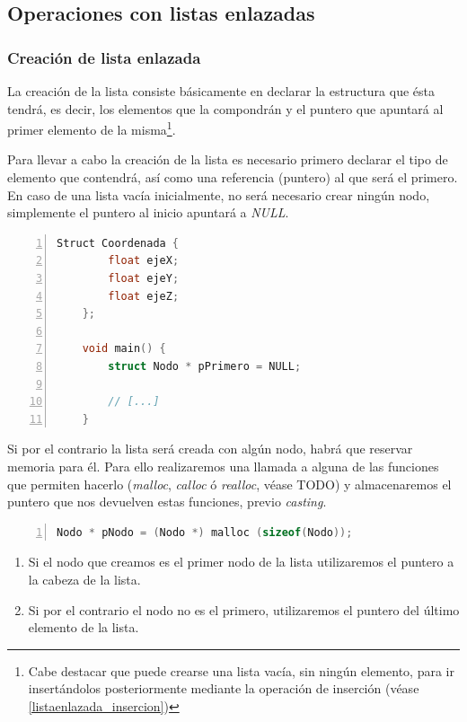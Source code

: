 \documentclass[a4paper, 11pt, titlepage]{article}
\begin{document}
    \subsection{Operaciones con listas enlazadas}

        \subsubsection{Creación de lista enlazada} 
        
            La creación de la lista consiste básicamente en declarar la estructura que ésta 
            tendrá, es decir, los elementos que la compondrán y el puntero que apuntará al 
            primer elemento de la misma\footnote{
                Cabe destacar que puede crearse una lista vacía, sin ningún elemento, para 
                ir insertándolos posteriormente mediante la operación de inserción (véase 
                \ref{listaenlazada_insercion})
            }.

            Para llevar a cabo la creación de la lista es necesario primero declarar el tipo 
            de elemento que contendrá, así como una referencia (puntero) al que será el primero.
            En caso de una lista vacía inicialmente, no será necesario crear ningún nodo, simplemente
            el puntero al inicio apuntará a \textit{NULL}.

            \begin{lstlisting}[language=C,numbers=left]
    Struct Coordenada {
        float ejeX;
        float ejeY;
        float ejeZ;
    };

    void main() {
        struct Nodo * pPrimero = NULL;

        // [...]
    }\end{lstlisting}

            Si por el contrario la lista será creada con algún nodo, habrá que reservar memoria
            para él. Para ello realizaremos una llamada a alguna de las funciones que permiten hacerlo 
            (\textit{malloc}, \textit{calloc} ó \textit{realloc}, véase TODO) y almacenaremos
            el puntero que nos devuelven estas funciones, previo \textit{casting}.
            
            \begin{lstlisting}[language=C,numbers=left]
    Nodo * pNodo = (Nodo *) malloc (sizeof(Nodo));\end{lstlisting}

            \begin{enumerate}
                \item Si el nodo que creamos es el primer nodo de la lista utilizaremos el puntero 
                a la cabeza de la lista.
                \item Si por el contrario el nodo no es el primero, utilizaremos el puntero del 
                último elemento de la lista.
            \end{enumerate}
\end{document}
